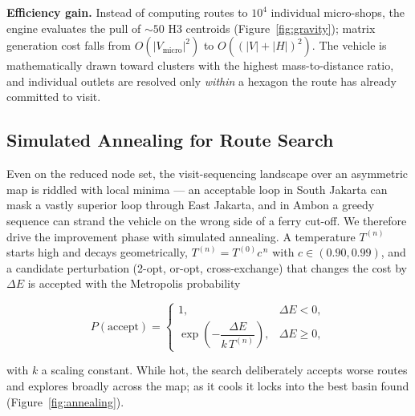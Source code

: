 \documentclass[11pt,a4paper,twocolumn]{article}
\begin{document}
\textbf{Efficiency gain.} Instead of computing routes to $10^4$
individual micro-shops, the engine evaluates the pull of ${\sim}50$ H3
centroids (Figure~\ref{fig:gravity}); matrix generation cost falls from
$O(|V_{\mathrm{micro}}|^2)$ to $O((|V| + |H|)^2)$. The vehicle is
mathematically drawn toward clusters with the highest mass-to-distance
ratio, and individual outlets are resolved only \emph{within} a hexagon the
route has already committed to visit.

\subsection{Simulated Annealing for Route Search}
\label{sec:annealing}

Even on the reduced node set, the visit-sequencing landscape over an
asymmetric map is riddled with local minima --- an acceptable loop in
South Jakarta can mask a vastly superior loop through East Jakarta, and in
Ambon a greedy sequence can strand the vehicle on the wrong side of a
ferry cut-off. We therefore drive the improvement phase with simulated
annealing. A temperature $T^{(n)}$ starts high and decays geometrically,
$T^{(n)} = T^{(0)} c^{\,n}$ with $c \in (0.90, 0.99)$, and a candidate
perturbation (2-opt, or-opt, cross-exchange) that changes the cost by
$\Delta E$ is accepted with the Metropolis probability

\begin{equation}
  \label{eq:boltzmann}
  P(\text{accept}) =
  \begin{cases}
    1, & \Delta E < 0, \\[0.4em]
    \exp\!\left( -\dfrac{\Delta E}{k \, T^{(n)}} \right), & \Delta E \ge 0,
  \end{cases}
\end{equation}

with $k$ a scaling constant. While hot, the search deliberately accepts
worse routes and explores broadly across the map; as it cools it locks
into the best basin found (Figure~\ref{fig:annealing}).
\end{document}
